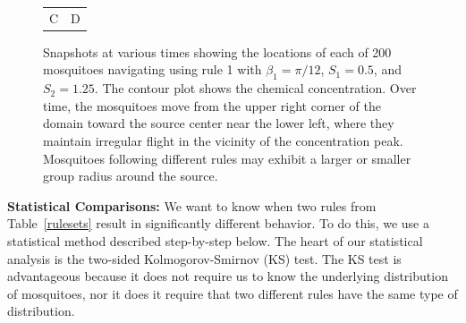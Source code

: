 \documentclass[12pt]{article}
\begin{document}
\begin{figure}[hb]
\begin{tabular}{cc}
		C & D 
	\end{tabular}
	\caption{Snapshots at various times showing the locations of each of 200 mosquitoes navigating using rule 1 with $\beta_1 = \pi/12$, $S_1 = 0.5$, and $S_2 = 1.25$. The contour plot shows the chemical concentration. Over time, the mosquitoes move from the upper right corner of the domain toward the source center near the lower left, where they maintain irregular flight in the vicinity of the concentration peak. Mosquitoes following different rules may exhibit a larger or smaller group radius around the source. }
	\label{mosqviz}
	\end{figure}

	\textbf{Statistical Comparisons:} We want to know when two rules from Table~\ref{rulesets} result in significantly different behavior. To do this, we use a statistical method described step-by-step below. The heart of our statistical analysis is the two-sided Kolmogorov-Smirnov (KS) test. The KS test is advantageous because it does not require us to know the underlying distribution of mosquitoes, nor it does it require that two different rules have the same type of distribution.
	
\end{document}
